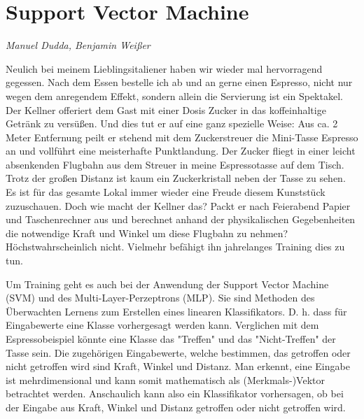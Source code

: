\section{Support Vector Machine}
\textit{Manuel Dudda, Benjamin Weißer}

Neulich bei meinem Lieblingsitaliener haben wir wieder mal hervorragend gegessen.
Nach dem Essen bestelle ich ab und an gerne einen Espresso, nicht nur wegen dem anregendem Effekt,
sondern allein die Servierung ist ein Spektakel.
Der Kellner offeriert dem Gast mit einer Dosis Zucker in das koffeinhaltige Getränk zu versüßen.
Und dies tut er auf eine ganz spezielle Weise: Aus ca. 2 Meter Entfernung peilt er stehend mit dem Zuckerstreuer die Mini-Tasse Espresso an und vollführt eine meisterhafte Punktlandung.
Der Zucker fliegt in einer leicht absenkenden Flugbahn aus dem Streuer in meine Espressotasse auf dem Tisch.
Trotz der großen Distanz ist kaum ein Zuckerkristall neben der Tasse zu sehen.
Es ist für das gesamte Lokal immer wieder eine Freude diesem Kunststück zuzuschauen.
Doch wie macht der Kellner das?
Packt er nach Feierabend Papier und Taschenrechner aus und berechnet anhand der physikalischen Gegebenheiten die notwendige Kraft und Winkel um diese Flugbahn zu nehmen?
Höchstwahrscheinlich nicht. Vielmehr befähigt ihn jahrelanges Training dies zu tun.

Um Training geht es auch bei der Anwendung der Support Vector Machine (SVM) und des Multi-Layer-Perzeptrons (MLP).
Sie sind Methoden des Überwachten Lernens zum Erstellen eines linearen Klassifikators. D. h. dass für Eingabewerte eine Klasse vorhergesagt werden kann.
Verglichen mit dem Espressobeispiel könnte eine Klasse das "{}Treffen"{} und das "Nicht-Treffen" der Tasse sein.
Die zugehörigen Eingabewerte, welche bestimmen, das getroffen oder nicht getroffen wird sind Kraft, Winkel und Distanz.
Man erkennt, eine Eingabe ist mehrdimensional und kann somit mathematisch als (Merkmals-)Vektor betrachtet werden. 
Anschaulich kann also ein Klassifikator vorhersagen, ob bei der Eingabe aus Kraft, Winkel und Distanz getroffen oder nicht getroffen wird.

